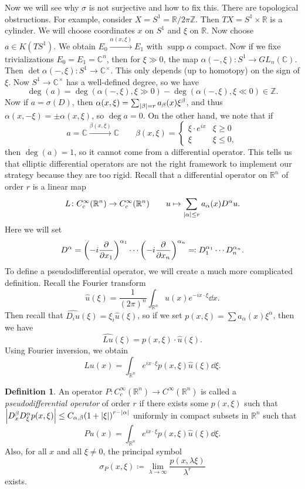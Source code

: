\documentclass[leqno, openany]{memoir}
\theoremstyle{definition}
\newtheorem{defn}[thm]{Definition}
\theoremstyle{remark}
\theoremstyle{plain}
\theoremstyle{definition}
\theoremstyle{remark}
\newcommand{\R}{\mathbb{R}}
\newcommand{\C}{\mathbb{C}}
\newcommand{\Z}{\mathbb{Z}}
\newcommand{\wh}[1]{\widehat{#1}}
\DeclareMathOperator{\supp}{supp}
\begin{document}
Now we will see why $\sigma$ is not surjective and how to fix this. There are
topological obstructions. For example, consider $X = S^1 = \R/2\pi \Z$. Then
$TX = S^1 \times \R$ is a cylinder. We will choose coordinates $x$ on $S^1$ and
$\xi$ on $\R$. Now choose $a \in K(TS^1)$. We obtain $E_0
\xrightarrow{\alpha(x, \xi)} E_1$ with $\supp \alpha$ compact. Now if we fixe
trivializations $E_0 = E_1 = \C^n$, then for $\xi \gg 0$, the map $\alpha(-,
\xi) \colon S^1 \to GL_n(\C)$. Then $\det \alpha(-,\xi) \colon S^1 \to
\C^{\times}$. This only depends (up to homotopy) on the sign of $\xi$. Now $S^1
\to \C^{\times}$ has a well-defined degree, so we have \[ \deg(a) =
\deg(\alpha(-, \xi), \xi \gg 0) - \deg(\alpha(-,\xi), \xi \ll 0) \in \Z. \] Now
if $a = \sigma(D)$, then $\alpha(x, \xi) = \sum_{\abs{\beta}=r} a_{\beta}(x)
\xi^{\beta}$, and thus $\alpha(x, -\xi) = \pm \alpha(x, \xi)$, so $\deg a = 0$.
On the other hand, we note that if \[ a = \C \xrightarrow{\beta(x, \xi)} \C
    \qquad \beta(x, \xi) = \begin{cases} \xi \cdot e^{ix} & \xi \geq 0 \\ \xi &
    \xi \leq 0, \end{cases} \] then $\deg(a) = 1$, so it cannot come from a
    differential operator. This tells us that elliptic differential operators
    are not the right framework to implement our strategy because they are too
    rigid. Recall that a differential operator on $\R^n$ of order $r$ is a
    linear map \[ L \colon C^{\infty}_c(\R^n) \to C^{\infty}_c(\R^n) \qquad u
        \mapsto \sum_{\abs{\alpha}\leq r} a_{\alpha}(x) D^{\alpha} u. \] Here
        we will set \[ D^{\alpha} = {\qty(-i \pdv{x_1})}^{\alpha_1} \cdots
        {\qty(-i \pdv{x_n})}^{\alpha_n} \eqqcolon D_1^{\alpha_1} \cdots
    D_n^{\alpha_n}. \] To define a pseudodifferential operator, we will create
    a much more complicated definition. Recall the Fourier transform \[
    \wh{u}(\xi) = \frac{1}{{(2\pi)}^n} \int_{\R^n} u(x) e^{-ix \cdot \xi}
\dd{x}. \] Then recall that $\wh{D_i u}(\xi) = \xi_i \wh{u}(\xi)$, so if we set
$p(x, \xi) = \sum a_{\alpha}(x) \xi^{\alpha}$, then we have \[ \wh{Lu}(\xi) =
    p(x, \xi) \cdot \wh{u}(\xi). \] Using Fourier inversion, we obtain \[ Lu(x)
= \int_{\R^n} e^{ix \cdot \xi} p(x, \xi) \wh{u}(\xi) \dd{\xi}. \]

\begin{defn} An operator $P \colon C^{\infty}_c(\R^n) \to C^{\infty}(\R^n)$ is
    called a \textit{pseudodifferential operator} of order $r$ if there exists
    some $p(x, \xi)$ such that $\abs{D_x^{\beta} D_{\xi}^{\alpha} p(x,\xi)}
    \leq C_{\alpha, \beta} {(1+\abs{\xi})}^{r-\abs{\alpha}}$ uniformly in
    compact subsets in $\R^n$ such that \[ Pu(x) = \int_{\R^n} e^{ix \cdot \xi}
        p(x, \xi) \wh{u}(\xi) \dd{\xi}. \] Also, for all $x$ and all $\xi \neq
        0$, the principal symbol \[ \sigma_P(x, \xi) \coloneqq \lim_{\lambda
        \to \infty} \frac{p(x, \lambda \xi)}{\lambda^r} \] exists.  \end{defn}
\end{document}
